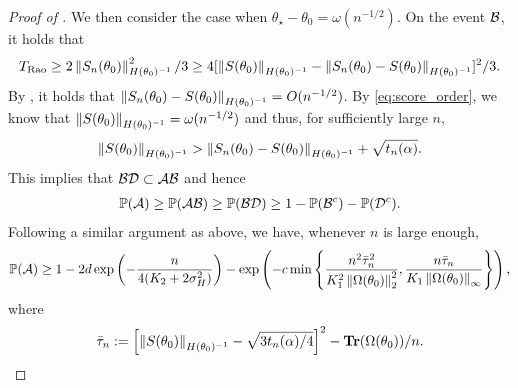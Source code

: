 \begin{proof}[Proof of ]
    We then consider the case when $\theta_\star - \theta_0 = \omega(n^{-1/2})$.
    On the event $\mathcal{B}$, it holds that
    \begin{align*}
        T_{\text{Rao}}
        \ge 2 \left\lVert S_n(\theta_0) \right\rVert_{H(\theta_0)^{-1}}^2 / 3
        \ge 4 [\left\lVert S(\theta_0) \right\rVert_{H(\theta_0)^{-1}} -  \left\lVert S_n(\theta_0) - S(\theta_0) \right\rVert_{H(\theta_0)^{-1}}]^2 / 3.
    \end{align*}
    By , it holds that $\left\lVert S_n(\theta_0) - S(\theta_0) \right\rVert_{H(\theta_0)^{-1}} = O(n^{-1/2})$.
    By \eqref{eq:score_order}, we know that $\left\lVert S(\theta_0) \right\rVert_{H(\theta_0)^{-1}} = \omega(n^{-1/2})$ and thus, for sufficiently large $n$,
    \begin{align*}
        \left\lVert S(\theta_0) \right\rVert_{H(\theta_0)^{-1}} > \left\lVert S_n(\theta_0) - S(\theta_0) \right\rVert_{H(\theta_0)^{-1}} + \sqrt{t_n(\alpha)}.
    \end{align*}
    This implies that $\mathcal{B} \mathcal{D} \subset \mathcal{A} \mathcal{B}$ and hence
    \begin{align*}
        \operatorname{\mathbb P}(\mathcal{A}) \ge \operatorname{\mathbb P}(\mathcal{A} \mathcal{B}) \ge \operatorname{\mathbb P}(\mathcal{B} \mathcal{D}) \ge 1 - \operatorname{\mathbb P}(\mathcal{B}^c) - \operatorname{\mathbb P}(\mathcal{D}^c).
    \end{align*}
    Following a similar argument as above, we have, whenever $n$ is large enough,
    \begin{align*}
        \operatorname{\mathbb P}(\mathcal{A}) \ge 1 - 2d \exp\left( - \frac{n}{4(K_2 + 2\sigma_H^2)} \right) - \exp\left( -c\min\left\{ \frac{n^2 \bar \tau_n^2}{K_1^2 \left\lVert \Omega(\theta_0) \right\rVert_2^2}, \frac{n\bar \tau_n}{K_1 \left\lVert \Omega(\theta_0) \right\rVert_\infty} \right\} \right),
    \end{align*}
    where
    \begin{align*}
        \bar \tau_n := \left[ \left\lVert S(\theta_0) \right\rVert_{H(\theta_0)^{-1}} - \sqrt{3t_n(\alpha)/4} \right]^2 - \operatorname{\bf Tr}(\Omega(\theta_0))/n.
    \end{align*}
    

\end{proof}
